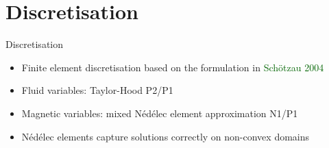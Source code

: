 \documentclass[12pt]{beamer}
\newcommand{\gr}[1]{\textcolor{darkgreen} {#1}}
\newcommand{\re}[1]{{\textcolor{red}       {#1}}}
\newcommand{\bl}[1]{{\textcolor{blue}{#1}}}
\begin{document}









\section{Discretisation}
\begin{frame}{Discretisation}

\begin{itemize}
  \item Finite element discretisation based on the formulation in \gr{Sch{\"o}tzau 2004}
  \item Fluid variables: Taylor-Hood P2/P1
  \item Magnetic variables: mixed {N\'{e}d\'{e}lec} element approximation N1/P1
  \item {N\'{e}d\'{e}lec} elements capture solutions correctly on non-convex domains
\end{itemize}


\end{frame}
\end{document}
